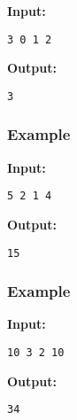 \textbf{    Input:   }
\begin{verbatim}
3 0 1 2\end{verbatim}

\textbf{    Output:   }
\begin{verbatim}
3\end{verbatim}

\subsubsection{   Example  }

\textbf{    Input:   }
\begin{verbatim}
5 2 1 4\end{verbatim}

\textbf{    Output:   }
\begin{verbatim}
15\end{verbatim}

\subsubsection{   Example  }

\textbf{    Input:   }
\begin{verbatim}
10 3 2 10\end{verbatim}

\textbf{    Output:   }
\begin{verbatim}
34\end{verbatim}

